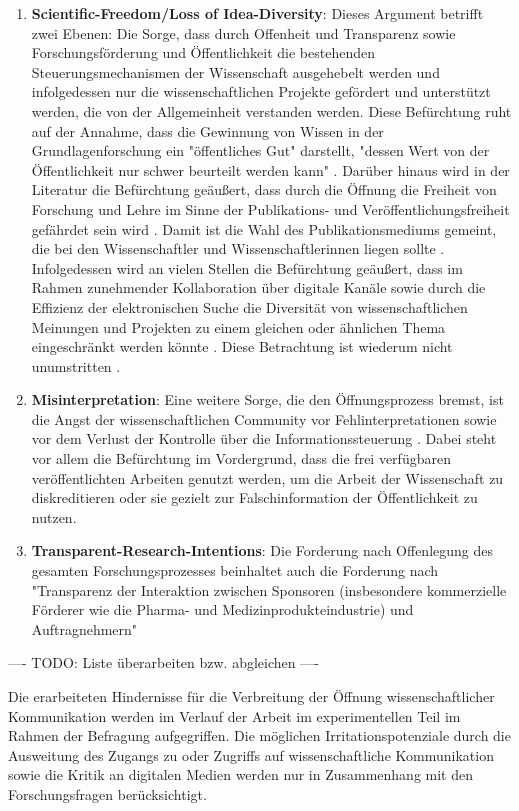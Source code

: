 \begin{enumerate}
\item \textbf{Scientific-Freedom/Loss of Idea-Diversity}: Dieses Argument betrifft zwei Ebenen: Die Sorge, dass durch Offenheit und Transparenz sowie Forschungsförderung und Öffentlichkeit die bestehenden Steuerungsmechanismen der Wissenschaft ausgehebelt werden und infolgedessen nur die wissenschaftlichen Projekte gefördert und unterstützt werden, die von der Allgemeinheit verstanden werden. Diese Befürchtung ruht auf der Annahme, dass die Gewinnung von Wissen in der Grundlagenforschung ein "öffentliches Gut" darstellt, "dessen Wert von der Öffentlichkeit nur schwer beurteilt werden kann" \cite{Osterloh_2008}. Darüber hinaus wird in der Literatur die Befürchtung geäußert, dass durch die Öffnung die Freiheit von Forschung und Lehre im Sinne der Publikations- und Veröffentlichungsfreiheit gefährdet sein wird \cite{Jochum_2009}. Damit ist die Wahl des Publikationsmediums gemeint, die bei den Wissenschaftler und Wissenschaftlerinnen liegen sollte \cite{BBAW_2015}. Infolgedessen wird an vielen Stellen die Befürchtung geäußert, dass im Rahmen zunehmender Kollaboration über digitale Kanäle sowie durch die Effizienz der elektronischen Suche die Diversität von wissenschaftlichen Meinungen und Projekten zu einem gleichen oder ähnlichen Thema eingeschränkt werden könnte \cite{Evans_2008}. Diese Betrachtung ist wiederum nicht unumstritten \cite{Lariviere_2009}.
\item \textbf{Misinterpretation}: Eine weitere Sorge, die den Öffnungsprozess bremst, ist die Angst der wissenschaftlichen Community vor Fehlinterpretationen \cite{Grand_2012} sowie vor dem Verlust der Kontrolle über die Informationssteuerung \cite{Gibbons_1994}. Dabei steht vor allem die Befürchtung im Vordergrund, dass die frei verfügbaren veröffentlichten Arbeiten genutzt werden, um die Arbeit der Wissenschaft zu diskreditieren oder sie gezielt zur Falschinformation der Öffentlichkeit zu nutzen.
\item \textbf{Transparent-Research-Intentions}: Die Forderung nach Offenlegung des gesamten Forschungsprozesses beinhaltet auch die Forderung nach "Transparenz der Interaktion zwischen Sponsoren (insbesondere kommerzielle Förderer wie die Pharma- und Medizinprodukteindustrie) und Auftragnehmern" \cite{Stengel_2013}
\end{enumerate}

---- TODO: Liste überarbeiten  bzw. abgleichen ----

Die erarbeiteten Hindernisse für die Verbreitung der Öffnung wissenschaftlicher Kommunikation werden im Verlauf der Arbeit im experimentellen Teil im Rahmen der Befragung aufgegriffen. Die möglichen Irritationspotenziale durch die Ausweitung des Zugangs zu oder Zugriffs auf wissenschaftliche Kommunikation sowie die Kritik an digitalen Medien werden nur in Zusammenhang mit den Forschungsfragen berücksichtigt.

